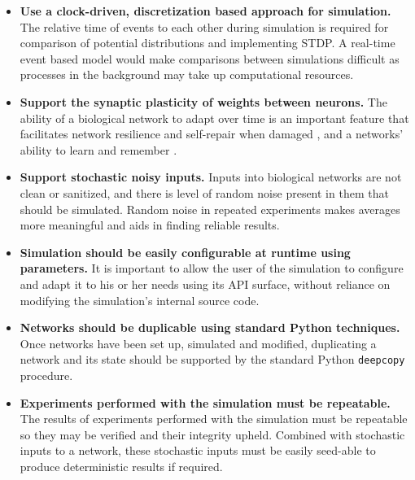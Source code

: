 \begin{itemize}
    \item \textbf{Use a clock-driven, discretization based approach for simulation.} The relative time of
          events to each other during simulation is required for comparison of
          potential distributions and implementing STDP. A real-time event based
          model would make comparisons between simulations difficult as processes in
          the background may take up computational resources.

    \item \textbf{Support the synaptic plasticity of weights between neurons.}
          The ability of a biological network to adapt over time is an important
          feature that facilitates network resilience and self-repair when damaged
          \autocite{trappenberg_fundamentals_2009}, and a networks' ability to learn
          and remember \autocite{eichenbaum_cognitive_2011}.

    \item \textbf{Support stochastic noisy inputs.} Inputs into biological
          networks are not clean or sanitized, and there is level of random noise
          present in them that should be simulated. Random noise in repeated
          experiments makes averages more meaningful and aids in finding reliable results.

    \item \textbf{Simulation should be easily configurable at runtime using
              parameters.} It is important to allow the user of the simulation to
          configure and adapt it to his or her needs using its API surface, without
          reliance on modifying the simulation's internal source code.

    \item \textbf{Networks should be duplicable using standard Python
              techniques.} Once networks have been set up, simulated and modified,
          duplicating a network and its state should be supported by the standard
          Python \texttt{deepcopy} procedure.

    \item \textbf{Experiments performed with the simulation must be repeatable.}
          The results of experiments performed with the simulation must be
          repeatable so they may be verified and their integrity upheld.
          Combined with stochastic inputs to a network, these stochastic inputs
          must be easily seed-able to produce deterministic results if required.


\end{itemize}
